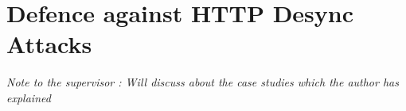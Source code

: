 \chapter{Defence against HTTP Desync Attacks}
\textit{Note to the supervisor : Will discuss about the case studies which the author has explained}